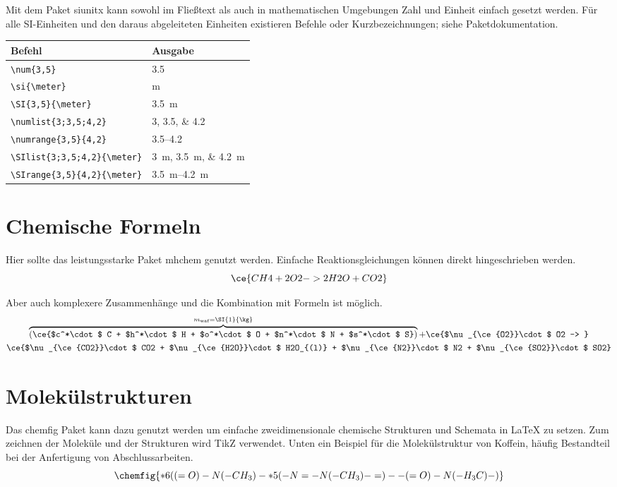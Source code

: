 Mit dem Paket siunitx kann sowohl im Fließtext als auch in mathematischen Umgebungen Zahl und Einheit einfach gesetzt werden. Für alle SI-Einheiten und den daraus abgeleiteten Einheiten existieren Befehle oder Kurzbezeichnungen; siehe Paketdokumentation.
\begin{center}
	\begin{tabular}{ll}
		Befehl &	Ausgabe\\
		\midrule
		\lstinline|\num{3,5}| &\num{3,5} \\
		\lstinline|\si{\meter}| &\si{\meter}  \\
		\lstinline|\SI{3,5}{\meter}| &\SI{3,5}{\meter}  \\
		\lstinline|\numlist{3;3,5;4,2}| &	\numlist{3;3,5;4,2}  \\
		\lstinline|\numrange{3,5}{4,2}| &\numrange{3,5}{4,2}  \\
		\lstinline|\SIlist{3;3,5;4,2}{\meter}| &\SIlist{3;3,5;4,2}{\meter}  \\
		\lstinline|\SIrange{3,5}{4,2}{\meter}|&\SIrange{3,5}{4,2}{\meter}\\
	\end{tabular}
\end{center}
  

\section{Chemische Formeln}
\label{sec:chem-formeln}

Hier sollte das leistungsstarke Paket mhchem genutzt werden. Einfache Reaktionsgleichungen können direkt hingeschrieben werden.
\begin{equation}
\ce{CH4 + 2O2 -> 2H2O + CO2}
\end{equation}

Aber auch komplexere Zusammenhänge und die Kombination mit Formeln ist möglich.
\begin{multline}
\label{eq:kohle_reaktion}
\overbrace{\left(\ce{$c^*\cdot$ C + $h^*\cdot$ H + $o^*\cdot$ O + $n^*\cdot$ N + $s^*\cdot$ S}\right)}^{m_{\text{waf}}=\SI{1}{\kg}} +
\ce{$\nu_{\ce{O2}}\cdot$ O2 -> }\\
\ce{$\nu_{\ce{CO2}}\cdot$ CO2 + $\nu_{\ce{H2O}}\cdot$ H2O_{(l)} + $\nu_{\ce{N2}}\cdot$ N2 + $\nu_{\ce{SO2}}\cdot$ SO2}
\end{multline}

\section{Molekülstrukturen}
Das chemfig Paket kann dazu genutzt werden um einfache zweidimensionale chemische Strukturen und Schemata in LaTeX zu setzen. Zum zeichnen der Moleküle und der Strukturen wird TikZ verwendet.  Unten ein Beispiel für die Molekülstruktur von Koffein, häufig Bestandteil bei der Anfertigung von Abschlussarbeiten.
\begin{equation}
\chemfig{*6((=O)-N(-CH_3)-*5(-N=-N(-CH_3)-=)--(=O)-N(-H_3C)-)}    
\end{equation}




